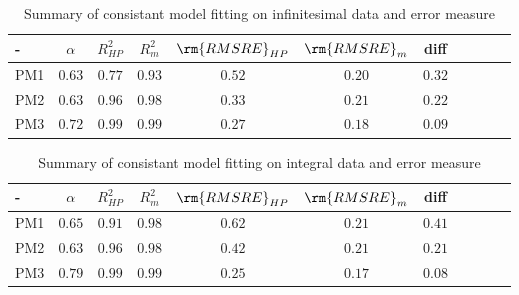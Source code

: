 \documentclass[draft,jgrga]{agutexSI2019}
\begin{document}
\begin{table}[htbp!]
\caption{Summary of consistant model fitting on infinitesimal data and error measure}

\begin{tabular}{l|c|c|c|c|c|c|c|c|c|c}
- & $\alpha$ & $R_{HP}^2$& $R_{m}^2$ & $\rm{RMSRE}_{HP}$ &$\rm{RMSRE}_{m}$ & diff \\
\hline
PM1 & $0.63$&$0.77$	&  $0.93$ &$0.52$ & $0.20$	& $0.32$\\
PM2 & $0.63$&$0.96$ &  $0.98$ &$0.33$ & $0.21$ 	& $0.22$\\
PM3 & $0.72$&$0.99$	&  $0.99$ &$0.27$ & $0.18$	& $0.09$\\
\end{tabular}
\label{tab:rmsre_infi}

\end{table}

\begin{table}[htbp!]
\caption{Summary of consistant model fitting on integral data and error measure}

\begin{tabular}{l|c|c|c|c|c|c|c|c|c|c}
- & $\alpha$ & $R_{HP}^2$& $R_{m}^2$ & $\rm{RMSRE}_{HP}$ &$\rm{RMSRE}_{m}$ & diff \\
\hline
PM1 & $0.65$&$0.91$	&  $0.98$ &$0.62$ &  $0.21$ & $0.41$\\
PM2 & $0.63$&$0.96$ &  $0.98$ &$0.42$ & $0.21$ & $0.21$\\
PM3 & $0.79$&$0.99$	&  $0.99$ & $0.25$ & $0.17$& $0.08$\\
\end{tabular}
\label{tab:rmsre_integral}

\end{table}
\end{document}
